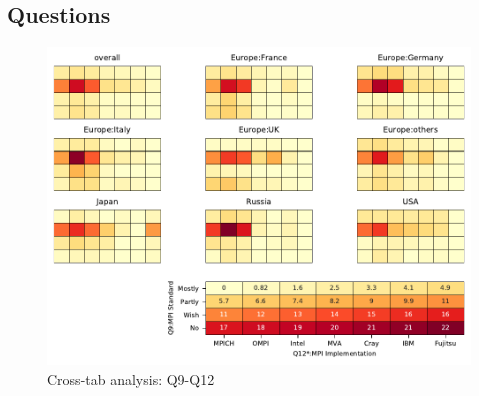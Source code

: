 
\subsection{Questions}


\begin{figure}
\begin{center}
\includegraphics[width=12cm]{../pdfs/Q9-Q12.pdf}
\caption{Cross-tab analysis: Q9-Q12}
\label{fig:Q9-Q12}
\end{center}
\end{figure}
